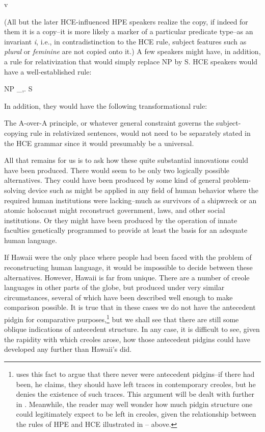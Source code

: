 \ea\label{ex:109}
 v
\glt 
\z

\noindent (All but the later HCE-influenced HPE speakers realize the copy, if indeed for them it is a copy--it is more likely a marker of a particular predicate type--as an invariant \textit{i}, i.e., in contradistinction to the HCE rule, subject features such as \textit{plural} or \textit{feminine} are not copied onto it.) A few speakers might have, in addition, a rule for relativization that would simply replace NP by S. HCE speakers would have a well-established rule:

\ea\label{ex:110}
 NP \_,. S
\glt 
\z

\noindent In addition, they would have the following transformational rule:



\ea\label{ex:111}

\z

\noindent The A-over-A principle, or whatever general constraint governs the subject-copying rule in relativized sentences, would not need to be separately stated in the HCE grammar since it would presumably be a universal.

All that remains for us is to ask how these quite substantial innovations could have been produced. There would seem to be only two logically possible alternatives. They could have been produced by some kind of general problem-solving device such as might be applied in any field of human behavior where the required human institutions were lacking--much as survivors of a shipwreck or an atomic holocaust might reconstruct government, laws, and other social institutions. Or they might have been produced by the operation of innate faculties genetically programmed to provide at least the basis for an adequate human language.

If Hawaii were the only place where people had been faced with the problem of reconstructing human language, it would be impossible to decide between these alternatives. However, Hawaii is far from unique. There are a number of creole languages in other parts of the globe, but produced under very similar circumstances, several of which have been described well enough to make comparison possible. It is true that in these cases we do not have the antecedent pidgin for comparative purposes,\footnote{\citet{Alleyne1979} uses this fact to argue that there never were antecedent pidgins--if there had been, he claims, they should have left traces in contemporary creoles, but he denies the existence of such traces. This argument will be dealt with further in . Meanwhile, the reader may well wonder how much pidgin structure one could legitimately expect to be left in creoles, given the relation\-ship between the rules of HPE and HCE illustrated in -- above.} but we shall see that there are still some oblique indications of antecedent structure. In any case, it is difficult to see, given the rapidity with which creoles arose, how those antecedent pidgins could have developed any further than Hawaii's did.

